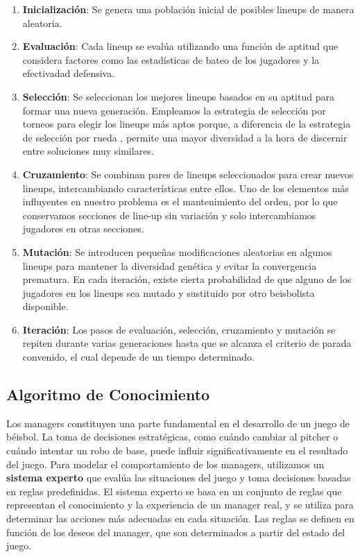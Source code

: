 \documentclass[runningheads]{llncs}
\begin{document}
        \begin{enumerate}
            \item \textbf{Inicialización}: Se genera una población inicial de posibles lineups de manera aleatoria.
            \item \textbf{Evaluación}: Cada lineup se evalúa utilizando una función de aptitud que considera factores como las estadísticas de bateo de los jugadores y la efectivadad defensiva.
            \item \textbf{Selección}: Se seleccionan los mejores lineups basados en su aptitud para formar una nueva generación. Empleamos la estrategia de selección por torneos \cite{tournamentselection} para elegir los lineups más aptos porque, a diferencia de la estrategia de selección por rueda \cite{roulettewheelselection}, permite una mayor diversidad a la hora de discernir entre soluciones muy similares.
            \item \textbf{Cruzamiento}: Se combinan pares de lineups seleccionados para crear nuevos lineups, intercambiando características entre ellos. Uno de los elementos más influyentes en nuestro problema es el mantenimiento del orden, por lo que conservamos secciones de line-up sin variación y solo intercambiamos jugadores en otras secciones.
            \item \textbf{Mutación}: Se introducen pequeñas modificaciones aleatorias en algunos lineups para mantener la diversidad genética y evitar la convergencia prematura. En cada iteración, existe cierta probabilidad de que alguno de los jugadores en los lineups sea mutado y sustituido por otro beisbolista disponible.
            \item \textbf{Iteración}: Los pasos de evaluación, selección, cruzamiento y mutación se repiten durante varias generaciones hasta que se alcanza el criterio de parada convenido, el cual depende de un tiempo determinado.
        \end{enumerate}

    \subsection{Algoritmo de Conocimiento}
        Los managers constituyen una parte fundamental en el desarrollo de un juego de béisbol. La toma de decisiones estratégicas, como cuándo cambiar al pitcher o cuándo intentar un robo de base, puede influir significativamente en el resultado del juego. Para modelar el comportamiento de los managers, utilizamos un \textbf{sistema experto} que evalúa las situaciones del juego y toma decisiones basadas en reglas predefinidas. El sistema experto se basa en un conjunto de reglas que representan el conocimiento y la experiencia de un manager real, y se utiliza para determinar las acciones más adecuadas en cada situación. Las reglas se definen en función de los deseos del manager, que son determinados a partir del estado del juego. 
\end{document}
